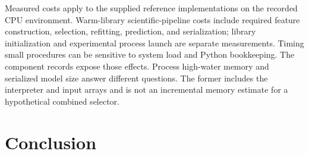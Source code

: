 Measured costs apply to the supplied reference implementations on the
recorded CPU environment. Warm-library scientific-pipeline costs include
required feature construction, selection, refitting, prediction, and
serialization; library initialization and experimental process launch are
separate measurements. Timing small procedures can be sensitive to system
load and Python bookkeeping. The component records expose those effects.
Process high-water memory and serialized model size answer different
questions. The former includes the interpreter and input arrays and is
not an incremental memory estimate for a hypothetical combined selector.

\section{Conclusion}\label{sec:conclusion}

